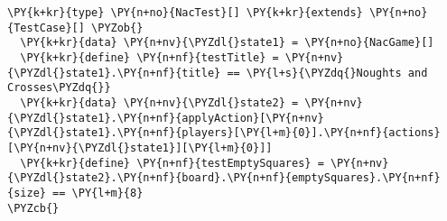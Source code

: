 \begin{Verbatim}[commandchars=\\\{\}]
\PY{k+kr}{type} \PY{n+no}{NacTest}[] \PY{k+kr}{extends} \PY{n+no}{TestCase}[] \PYZob{}
  \PY{k+kr}{data} \PY{n+nv}{\PYZdl{}state1} = \PY{n+no}{NacGame}[]
  \PY{k+kr}{define} \PY{n+nf}{testTitle} = \PY{n+nv}{\PYZdl{}state1}.\PY{n+nf}{title} == \PY{l+s}{\PYZdq{}Noughts and Crosses\PYZdq{}}
  \PY{k+kr}{data} \PY{n+nv}{\PYZdl{}state2} = \PY{n+nv}{\PYZdl{}state1}.\PY{n+nf}{applyAction}[\PY{n+nv}{\PYZdl{}state1}.\PY{n+nf}{players}[\PY{l+m}{0}].\PY{n+nf}{actions}[\PY{n+nv}{\PYZdl{}state1}][\PY{l+m}{0}]]
  \PY{k+kr}{define} \PY{n+nf}{testEmptySquares} = \PY{n+nv}{\PYZdl{}state2}.\PY{n+nf}{board}.\PY{n+nf}{emptySquares}.\PY{n+nf}{size} == \PY{l+m}{8}
\PYZcb{}
\end{Verbatim}
